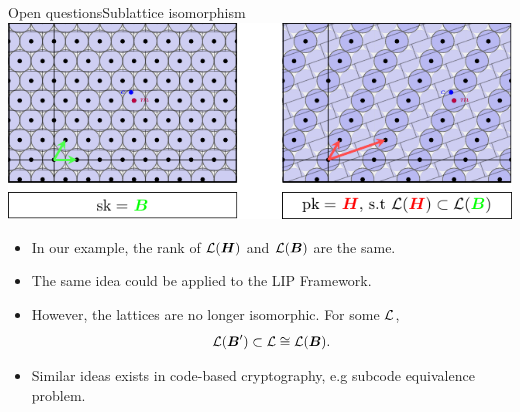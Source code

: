 \documentclass[10pt]{beamer}
\begin{document}
\begin{frame}{Open questions}{Sublattice isomorphism}
				\includegraphics{figures/working-with-sublattices.pdf}

				\begin{itemize}
								\item In our example, the rank of $\mathcal{L}(\boldsymbol{H})$ and $\mathcal{L}(\boldsymbol{B})$ are the same.
								\item The same idea could be applied to the LIP Framework.
								\item However, the lattices are no longer isomorphic. For some $\mathcal{L}$, \[\mathcal{L}(\boldsymbol{B}') \subset \mathcal{L} \cong \mathcal{L}(\boldsymbol{B}).\]
								\item Similar ideas exists in code-based cryptography, e.g subcode equivalence problem.
				\end{itemize}
\end{frame}
\end{document}
